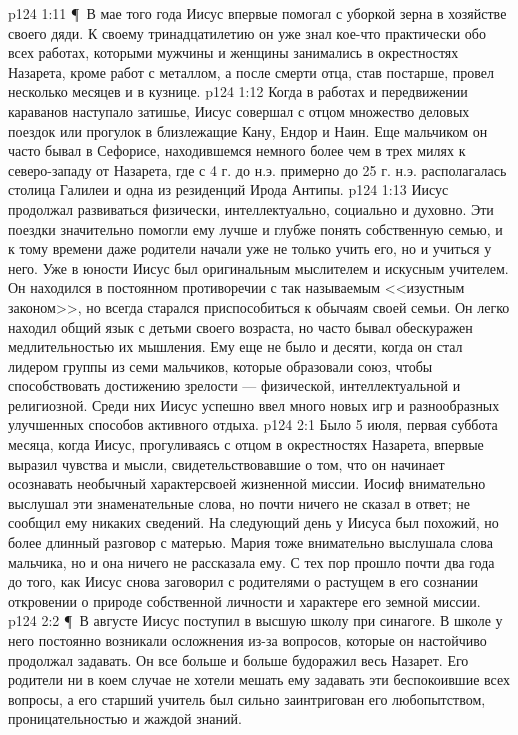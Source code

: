 \vs p124 1:11 \P\ В мае того года Иисус впервые помогал с уборкой зерна в хозяйстве своего дяди. К своему тринадцатилетию он уже знал кое\hyp{}что практически обо всех работах, которыми мужчины и женщины занимались в окрестностях Назарета, кроме работ с металлом, а после смерти отца, став постарше, провел несколько месяцев и в кузнице.
\vs p124 1:12 Когда в работах и передвижении караванов наступало затишье, Иисус совершал с отцом множество деловых поездок или прогулок в близлежащие Кану, Ендор и Наин. Еще мальчиком он часто бывал в Сефорисе, находившемся немного более чем в трех милях к северо\hyp{}западу от Назарета, где с 4 г. до н.э. примерно до 25 г. н.э. располагалась столица Галилеи и одна из резиденций Ирода Антипы.
\vs p124 1:13 Иисус продолжал развиваться физически, интеллектуально, социально и духовно. Эти поездки значительно помогли ему лучше и глубже понять собственную семью, и к тому времени даже родители начали уже не только учить его, но и учиться у него. Уже в юности Иисус был оригинальным мыслителем и искусным учителем. Он находился в постоянном противоречии с так называемым <<изустным законом>>, но всегда старался приспособиться к обычаям своей семьи. Он легко находил общий язык с детьми своего возраста, но часто бывал обескуражен медлительностью их мышления. Ему еще не было и десяти, когда он стал лидером группы из семи мальчиков, которые образовали союз, чтобы способствовать достижению зрелости --- физической, интеллектуальной и религиозной. Среди них Иисус успешно ввел много новых игр и разнообразных улучшенных способов активного отдыха.
\vs p124 2:1 Было 5 июля, первая суббота месяца, когда Иисус, прогуливаясь с отцом в окрестностях Назарета, впервые выразил чувства и мысли, свидетельствовавшие о том, что он начинает осознавать необычный характерсвоей жизненной миссии. Иосиф внимательно выслушал эти знаменательные слова, но почти ничего не сказал в ответ; не сообщил ему никаких сведений. На следующий день у Иисуса был похожий, но более длинный разговор с матерью. Мария тоже внимательно выслушала слова мальчика, но и она ничего не рассказала ему. С тех пор прошло почти два года до того, как Иисус снова заговорил с родителями о растущем в его сознании откровении о природе собственной личности и характере его земной миссии.
\vs p124 2:2 \P\ В августе Иисус поступил в высшую школу при синагоге. В школе у него постоянно возникали осложнения из\hyp{}за вопросов, которые он настойчиво продолжал задавать. Он все больше и больше будоражил весь Назарет. Его родители ни в коем случае не хотели мешать ему задавать эти беспокоившие всех вопросы, а его старший учитель был сильно заинтригован его любопытством, проницательностью и жаждой знаний.
